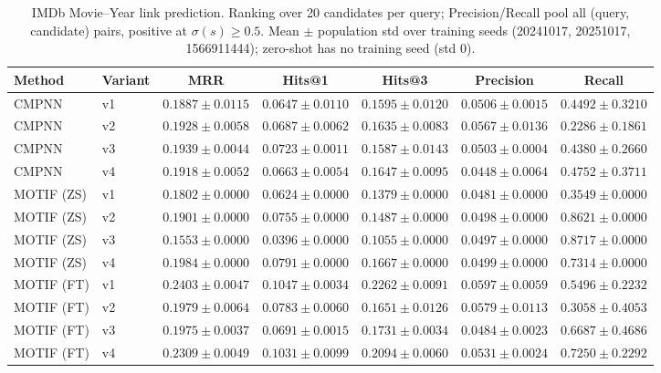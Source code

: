 \documentclass{article}
\begin{document}
\begin{table}[t]
\centering
\small
\begin{tabular}{||l||l||c|c|c||c|c||}
\hline
\textbf{Method} & \textbf{Variant} & \textbf{MRR} & \textbf{Hits@1} & \textbf{Hits@3} & \textbf{Precision} & \textbf{Recall} \\
\hline\hline
CMPNN & v1 & $0.1887 \pm 0.0115$ & $0.0647 \pm 0.0110$ & $0.1595 \pm 0.0120$ & $0.0506 \pm 0.0015$ & $0.4492 \pm 0.3210$ \\
\hline
CMPNN & v2 & $0.1928 \pm 0.0058$ & $0.0687 \pm 0.0062$ & $0.1635 \pm 0.0083$ & $0.0567 \pm 0.0136$ & $0.2286 \pm 0.1861$ \\
\hline
CMPNN & v3 & $0.1939 \pm 0.0044$ & $0.0723 \pm 0.0011$ & $0.1587 \pm 0.0143$ & $0.0503 \pm 0.0004$ & $0.4380 \pm 0.2660$ \\
\hline
CMPNN & v4 & $0.1918 \pm 0.0052$ & $0.0663 \pm 0.0054$ & $0.1647 \pm 0.0095$ & $0.0448 \pm 0.0064$ & $0.4752 \pm 0.3711$ \\
\hline
\hline
MOTIF (ZS) & v1 & $0.1802 \pm 0.0000$ & $0.0624 \pm 0.0000$ & $0.1379 \pm 0.0000$ & $0.0481 \pm 0.0000$ & $0.3549 \pm 0.0000$ \\
\hline
MOTIF (ZS) & v2 & $0.1901 \pm 0.0000$ & $0.0755 \pm 0.0000$ & $0.1487 \pm 0.0000$ & $0.0498 \pm 0.0000$ & $0.8621 \pm 0.0000$ \\
\hline
MOTIF (ZS) & v3 & $0.1553 \pm 0.0000$ & $0.0396 \pm 0.0000$ & $0.1055 \pm 0.0000$ & $0.0497 \pm 0.0000$ & $0.8717 \pm 0.0000$ \\
\hline
MOTIF (ZS) & v4 & $0.1984 \pm 0.0000$ & $0.0791 \pm 0.0000$ & $0.1667 \pm 0.0000$ & $0.0499 \pm 0.0000$ & $0.7314 \pm 0.0000$ \\
\hline
\hline
MOTIF (FT) & v1 & $0.2403 \pm 0.0047$ & $0.1047 \pm 0.0034$ & $0.2262 \pm 0.0091$ & $0.0597 \pm 0.0059$ & $0.5496 \pm 0.2232$ \\
\hline
MOTIF (FT) & v2 & $0.1979 \pm 0.0064$ & $0.0783 \pm 0.0060$ & $0.1651 \pm 0.0126$ & $0.0579 \pm 0.0113$ & $0.3058 \pm 0.4053$ \\
\hline
MOTIF (FT) & v3 & $0.1975 \pm 0.0037$ & $0.0691 \pm 0.0015$ & $0.1731 \pm 0.0034$ & $0.0484 \pm 0.0023$ & $0.6687 \pm 0.4686$ \\
\hline
MOTIF (FT) & v4 & $0.2309 \pm 0.0049$ & $0.1031 \pm 0.0099$ & $0.2094 \pm 0.0060$ & $0.0531 \pm 0.0024$ & $0.7250 \pm 0.2292$ \\
\hline
\end{tabular}
\caption{IMDb Movie--Year link prediction. Ranking over 20 candidates per query; Precision/Recall pool all (query, candidate) pairs, positive at $\sigma(s) \geq 0.5$. Mean $\pm$ population std over training seeds (20241017, 20251017, 1566911444); zero-shot has no training seed (std 0). }
\label{tab:imdb_movie_year_seed_performance}
\end{table}
\end{document}

